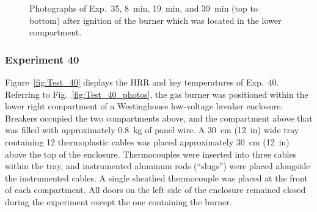 \begin{figure}[p]
\caption[Photographs of Exp.~35]{Photographs of Exp.~35, 8~min, 19~min, and 39~min (top to bottom) after ignition of the burner which was located in the lower compartment.}
\label{fig:Test_35_photos}
\end{figure}


\clearpage

\subsubsection{Experiment 40}

Figure~\ref{fig:Test_40} displays the HRR and key temperatures of Exp.~40. Referring to Fig.~\ref{fig:Test_40_photos}, the gas burner was positioned within the lower right compartment of a Westinghouse low-voltage breaker enclosure. Breakers occupied the two compartments above, and the compartment above that was filled with approximately 0.8~kg of panel wire. A 30~cm (12~in) wide tray containing 12 thermoplastic cables was placed approximately 30~cm (12~in) above the top of the enclosure. Thermocouples were inserted into three cables within the tray, and instrumented aluminum rods (``slugs'') were placed alongside the instrumented cables. A single sheathed thermocouple was placed at the front of each compartment. All doors on the left side of the enclosure remained closed during the experiment except the one containing the burner.

